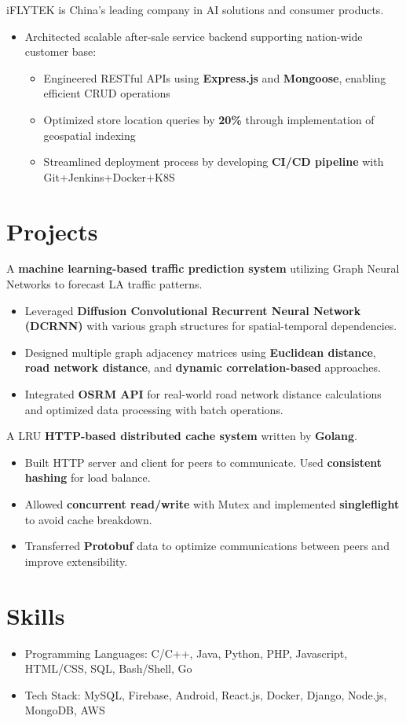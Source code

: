 \documentclass{resume}
\begin{document}
  iFLYTEK is China's leading company in AI solutions and consumer products.
\begin{itemize}
  \item Architected scalable after-sale service backend supporting nation-wide customer base:
  \begin{itemize}
    \item Engineered RESTful APIs using \textbf{Express.js} and \textbf{Mongoose}, enabling efficient CRUD operations
    \item Optimized store location queries by \textbf{20\%} through implementation of geospatial indexing
    \item Streamlined deployment process by developing \textbf{CI/CD pipeline} with Git+Jenkins+Docker+K8S
  \end{itemize}
\end{itemize}

\section{Projects}

A \textbf{machine learning-based traffic prediction system} utilizing Graph Neural Networks to forecast LA traffic patterns.
\begin{itemize}
\item Leveraged \textbf{Diffusion Convolutional Recurrent Neural Network (DCRNN)} with various graph structures for spatial-temporal dependencies.
\item Designed multiple graph adjacency matrices using \textbf{Euclidean distance}, \textbf{road network distance}, and \textbf{dynamic correlation-based} approaches.
\item Integrated \textbf{OSRM API} for real-world road network distance calculations and optimized data processing with batch operations.
\end{itemize}

  A LRU \textbf{HTTP-based distributed cache system} written by \textbf{Golang}.
\begin{itemize}
  \item Built HTTP server and client for peers to communicate. Used \textbf{consistent hashing} for load balance.
  \item Allowed \textbf{concurrent read/write} with Mutex and implemented \textbf{singleflight} to avoid cache breakdown.
  \item Transferred \textbf{Protobuf} data to optimize communications between peers and improve extensibility.
\end{itemize}



\section{Skills}
\begin{itemize}[parsep=0.5ex]
  \item Programming Languages: C/C++, Java, Python, PHP, Javascript, HTML/CSS, SQL, Bash/Shell, Go
  \item Tech Stack: MySQL, Firebase, Android, React.js, Docker, Django, Node.js, MongoDB, AWS
\end{itemize}
\end{document}
